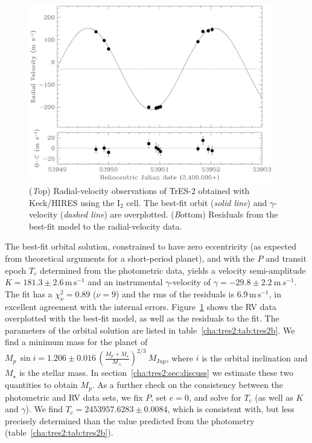 \begin{figure}
\begin{center}
\includegraphics[width=0.95\textwidth]{4_f2}
\caption[Radial-velocity observations of TrES-2]{({\textit Top}) Radial-velocity observations of TrES-2 obtained
  with Keck/HIRES using the I$_{2}$ cell. The best-fit orbit
  (\textit{solid line}) and $\gamma$-velocity (\textit{dashed line})
  are overplotted. ({\textit Bottom}) Residuals from the best-fit
  model to the radial-velocity data.}\label{cha:tres2:fig:rvtres2}
\end{center}
\end{figure}

The best-fit orbital solution, constrained to have zero eccentricity
(as expected from theoretical arguments for a short-period planet),
and with the $P$ and transit epoch $T_{c}$ determined from the
photometric data, yields a velocity semi-amplitude $K =
181.3\pm2.6\,\mathrm{m\,s^{-1}}$ and an instrumental
${\gamma}$-velocity of ${\gamma} = -29.8 \pm 2.2\ {\mathrm m\,
  s^{-1}}$. The fit has a $\chi^2_\nu = 0.89$ ($\nu=9$) and the rms of the
residuals is $6.9\,\mathrm{m\,s^{-1}}$, in excellent agreement with
the internal errors.  Figure~\ref{cha:tres2:fig:rvtres2} shows the RV data
overplotted with the best-fit model, as well as the residuals to the
fit. The parameters of the orbital solution are listed in
table~\ref{cha:tres2:tab:tres2b}. We find a minimum mass for the planet of
$M_{p}\, \sin{i} = 1.206 \pm 0.016\, (\frac{M_p + M_{\star}}{M_{\sun}})^{2/3}\ M_{\mathrm Jup}$,%
where $i$ is
the orbital inclination and $M_{\star}$
is the stellar mass.  In section~\ref{cha:tres2:sec:discuss} we estimate these two quantities to obtain
$M_{p}$.  As a further check on the consistency between the
photometric and RV data sets, we fix $P$, set $e=0$, and solve for
$T_c$ (as well as $K$ and ${\gamma}$).  We find $T_{c}=2453957.6283
\pm 0.0084$, which is consistent with, but less precisely determined
than the value predicted from the photometry (table~\ref{cha:tres2:tab:tres2b}).

